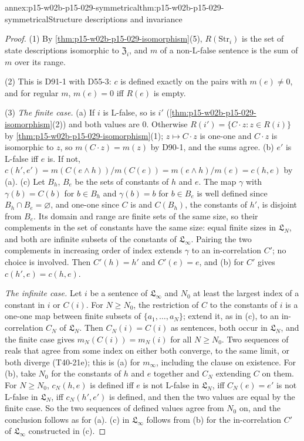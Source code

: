\begin{annexitem}{annex:p15-w02b-p15-029-symmetrical}{thm:p15-w02b-p15-029-symmetrical}{Structure descriptions and invariance}
\begin{proof}
(1) By \cref{thm:p15-w02b-p15-029-isomorphism}(5), \(R(\mathrm{Str}_i)\)
is the set of state descriptions isomorphic to \(\mathfrak Z_i\), and
\(m\) of a non-L-false sentence is the sum of \(m\) over its range.

(2) This is D91-1 with D55-3: \(c\) is defined exactly on the pairs with
\(m(e)\ne0\), and for regular \(m\), \(m(e)=0\) iff \(R(e)\) is empty.

(3) \emph{The finite case.} (a) If \(i\) is L-false, so is \(i'\)
(\cref{thm:p15-w02b-p15-029-isomorphism}(2)) and both values are
\(0\). Otherwise \(R(i')=\{C\cdot z:z\in R(i)\}\) by
\cref{thm:p15-w02b-p15-029-isomorphism}(1); \(z\mapsto C\cdot z\) is
one-one and \(C\cdot z\) is isomorphic to \(z\), so
\(m(C\cdot z)=m(z)\) by D90-1, and the sums agree. (b) \(e'\) is
L-false iff \(e\) is. If not,
\(c(h',e')=m(C(e\land h))/m(C(e))=m(e\land h)/m(e)=c(h,e)\) by (a).
(c) Let \(B_h\), \(B_e\) be the sets of constants of \(h\) and \(e\).
The map \(\gamma\) with \(\gamma(b)=C(b)\) for \(b\in B_h\) and
\(\gamma(b)=b\) for \(b\in B_e\) is well defined since
\(B_h\cap B_e=\varnothing\), and one-one since \(C\) is and
\(C(B_h)\), the constants of \(h'\), is disjoint from \(B_e\). Its
domain and range are finite sets of the same size, so their complements
in the set of constants have the same size: equal finite sizes in
\(\mathfrak L_N\), and both are infinite subsets of the constants of
\(\mathfrak L_\infty\). Pairing the two complements in increasing order
of index extends \(\gamma\) to an in-correlation \(C'\); no choice is
involved. Then \(C'(h)=h'\) and \(C'(e)=e\), and (b) for \(C'\) gives
\(c(h',e)=c(h,e)\).

\emph{The infinite case.} Let \(i\) be a sentence of
\(\mathfrak L_\infty\) and \(N_0\) at least the largest index of a
constant in \(i\) or \(C(i)\). For \(N\geq N_0\), the restriction of
\(C\) to the constants of \(i\) is a one-one map between finite subsets
of \(\{a_1,\ldots,a_N\}\); extend it, as in (c), to an in-correlation
\(C_N\) of \(\mathfrak L_N\). Then \(C_N(i)=C(i)\) as sentences, both
occur in \(\mathfrak L_N\), and the finite case gives
\(m_N(C(i))=m_N(i)\) for all \(N\geq N_0\). Two sequences of reals
that agree from some index on either both converge, to the same limit,
or both diverge (T40-21e); this is (a) for \(m_\infty\), including the
clause on existence. For (b), take \(N_0\) for the constants of \(h\)
and \(e\) together and \(C_N\) extending \(C\) on them. For
\(N\geq N_0\), \(c_N(h,e)\) is defined iff \(e\) is not L-false in
\(\mathfrak L_N\), iff \(C_N(e)=e'\) is not L-false in
\(\mathfrak L_N\), iff \(c_N(h',e')\) is defined, and then the two
values are equal by the finite case. So the two sequences of defined
values agree from \(N_0\) on, and the conclusion follows as for (a).
(c) in \(\mathfrak L_\infty\) follows from (b) for the in-correlation
\(C'\) of \(\mathfrak L_\infty\) constructed in (c).


\end{proof}
\end{annexitem}
